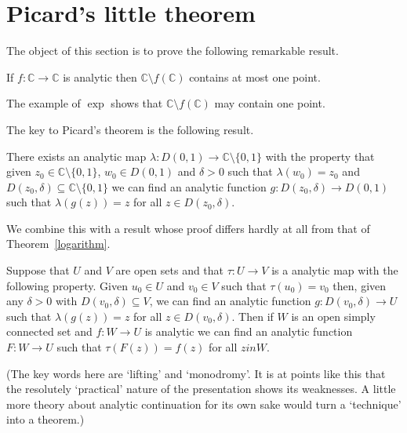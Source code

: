 \section{Picard's little theorem} The object of this section
is to prove the following remarkable result.
\begin{theorem} If
$f:{\mathbb C}\rightarrow{\mathbb C}$ is analytic then
${\mathbb C}\setminus f({\mathbb C})$ contains
at most one point.
\end{theorem}
The example of $\exp$ shows that 
${\mathbb C}\setminus f({\mathbb C})$
may contain one point.

The key to Picard's theorem is the following result.
\begin{theorem}\label{Picard cover}
There exists an analytic map 
$\lambda:D(0,1)\rightarrow {\mathbb C}\setminus\{0,1\}$
with the property that given $z_{0}\in {\mathbb C}\setminus\{0,1\}$,
$w_{0}\in D(0,1)$ and $\delta>0$ such that
$\lambda(w_{0})=z_{0}$ and
$D(z_{0},\delta)\subseteq {\mathbb C}\setminus\{0,1\}$
we can find 
an analytic function 
$g:D(z_{0},\delta)\rightarrow D(0,1)$
such that $\lambda (g(z))=z$ for all $z\in D(z_{0},\delta)$.
\end{theorem}

We combine this with a result whose proof differs hardly at all
from that of Theorem~\ref{logarithm}.
\begin{lemma}\label{pull up}
Suppose that $U$ and $V$ are
open sets and that $\tau:U\rightarrow V$ is a
analytic map with the following property.
Given $u_{0}\in U$
and $v_{0}\in V$ such that
$\tau(u_{0})=v_{0}$ then, given any $\delta>0$ with
$D(v_{0},\delta)\subseteq V$, we can find   
an analytic function 
$g:D(v_{0},\delta)\rightarrow U$
such that $\lambda (g(z))=z$ for all $z\in D(v_{0},\delta)$.
Then if $W$ is an open simply connected set
and $f:W\rightarrow U$
is analytic we can find an analytic
function $F:W\rightarrow U$
such that $\tau(F(z))=f(z)$ for all $z in W$. 
\end{lemma}
(The key words here are `lifting' and `monodromy'. It is at points
like this that the resolutely `practical' nature of the presentation
shows its weaknesses. A little more theory about analytic
continuation for its own sake would turn a `technique'
into a theorem.)


